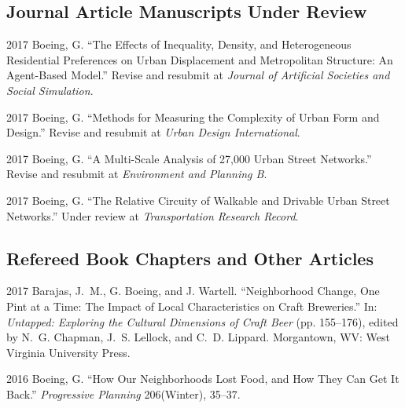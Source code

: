 \documentclass{academiccv}
\begin{document}
\subsection*{Journal Article Manuscripts Under Review}

\begin{tablist}

\item[2017] \tab Boeing, G. \enquote{The Effects of Inequality, Density, and Heterogeneous Residential Preferences on Urban Displacement and Metropolitan Structure: An Agent-Based Model.} Revise and resubmit at \emph{Journal of Artificial Societies and Social Simulation}.

\item[2017] \tab Boeing, G. \enquote{Methods for Measuring the Complexity of Urban Form and Design.} Revise and resubmit at \emph{Urban Design International}.

\item[2017] \tab Boeing, G. \enquote{A Multi-Scale Analysis of 27,000 Urban Street Networks.} Revise and resubmit at \emph{Environment and Planning B}.

\item[2017] \tab Boeing, G. \enquote{The Relative Circuity of Walkable and Drivable Urban Street Networks.} Under review at \emph{Transportation Research Record}.

\end{tablist}



\subsection*{Refereed Book Chapters and Other Articles}

\begin{tablist}

\item[2017] \tab Barajas, J.~M., G. Boeing, and J. Wartell. \enquote{Neighborhood Change, One Pint at a Time: The Impact of Local Characteristics on Craft Breweries.} In: \emph{Untapped: Exploring the Cultural Dimensions of Craft Beer} (pp. 155--176), edited by N.~G. Chapman, J.~S. Lellock, and C.~D. Lippard. Morgantown, WV: West Virginia University Press.

\item[2016] \tab Boeing, G. \enquote{How Our Neighborhoods Lost Food, and How They Can Get It Back.} \emph{Progressive Planning} 206(Winter), 35--37.

\end{tablist}
\end{document}
